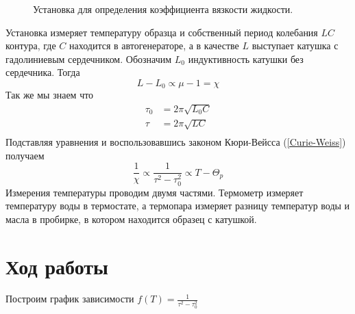 \documentclass[a4paper, 12pt]{article}
\begin{document}
        \begin{figure}[h]
            \caption{Установка для определения коэффициента вязкости жидкости.}
            \label{img:ustanovka}
            \newpage
        \end{figure}

        Установка измеряет температуру образца и собственный период колебания $LC$ контура, где $C$ находится в автогенераторе, а в качестве $L$ выступает катушка с гадолиниевым сердечником. Обозначим $L_0$ индуктивность катушки без сердечника. Тогда
        \begin{equation*}
            L - L_0 \propto \mu - 1 = \chi
        \end{equation*}
        Так же мы знаем что
        \begin{align*}
            \tau_0 &= 2\pi\sqrt{L_0C} \\
            \tau &= 2\pi\sqrt{LC} \\
        \end{align*}
        Подставляя уравнения и воспользовавшись законом Кюри-Вейсса (\ref{Curie-Weiss}) получаем
        \begin{equation}
            \frac{1}{\chi} \propto \frac{1}{\tau^2 - \tau_0^2} \propto T - \Theta_p
        \end{equation}
        Измерения температуры проводим двумя частями. Термометр измеряет температуру воды в термостате, а термопара измеряет разницу температур воды и масла в пробирке, в котором находится образец с катушкой.

    \section{Ход работы}

        Построим график зависимости $f(T) = \frac{1}{\tau^2 - \tau_0^2}$
\end{document}
